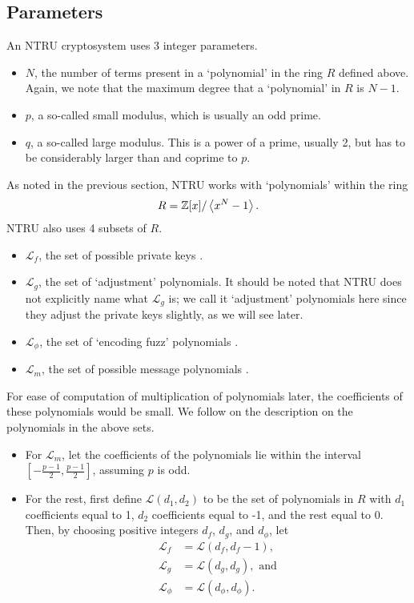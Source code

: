 \subsection{Parameters}
An NTRU cryptosystem uses 3 integer parameters.
\begin{itemize}
    \item $N$, the number of terms present in a `polynomial' in the ring $R$ defined above. Again, we note that the maximum degree that a `polynomial' in $R$ is $N - 1$.
    \item $p$, a so-called small modulus, which is usually an odd prime.
    \item $q$, a so-called large modulus. This is a power of a prime, usually 2, but has to be considerably larger than and coprime to $p$.
\end{itemize}

As noted in the previous section, NTRU works with `polynomials' within the ring
\[
    R = \mathbb{Z}[x] / \left\langle x^N - 1\right\rangle.
\]
NTRU also uses 4 subsets of $R$.
\begin{itemize}
    \item $\mathcal{L}_f$, the set of possible private keys \cite[\S 1.2]{hoffstein_pipher_silverman_1998}.
    \item $\mathcal{L}_g$, the set of `adjustment' polynomials. It should be noted that NTRU does not explicitly name what $\mathcal{L}_g$ is; we call it `adjustment' polynomials here since they adjust the private keys slightly, as we will see later.
    \item $\mathcal{L}_\phi$, the set of `encoding fuzz' polynomials \cite[\S 1.3]{hoffstein_pipher_silverman_1996}.
    \item $\mathcal{L}_m$, the set of possible message polynomials \cite[\S 1.3]{hoffstein_pipher_silverman_1998}.
\end{itemize}

For ease of computation of multiplication of polynomials later, the coefficients of these polynomials would be small. We follow \cite[\S~2.2]{hoffstein_pipher_silverman_1998} on the description on the polynomials in the above sets.
\begin{itemize}
    \item For $\mathcal{L}_m$, let the coefficients of the polynomials lie within the interval $\left[-\frac{p-1}2, \frac{p-1}2\right]$, assuming $p$ is odd.
    \item For the rest, first define $\mathcal{L}(d_1, d_2)$ to be the set of polynomials in $R$ with $d_1$ coefficients equal to 1, $d_2$ coefficients equal to -1, and the rest equal to 0. Then, by choosing positive integers $d_f$, $d_g$, and $d_\phi$, let
    \begin{align*}
        \mathcal{L}_f &= \mathcal{L}(d_f, d_f-1),\\
        \mathcal{L}_g &= \mathcal{L}(d_g, d_g), \text{ and}\\
        \mathcal{L}_\phi &= \mathcal{L}(d_\phi, d_\phi).
    \end{align*}
\end{itemize}


